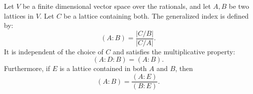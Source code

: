 Let $V$ be a finite dimensional vector space over the rationals, and let $A, B$ be two lattices in $V$. Let $C$ be a lattice containing both. The generalized index is defined by:
$$(A : B) = \frac{|C/B|}{|C/A|}.$$
It is independent of the choice of $C$ and satisfies the multiplicative property:
$$(A : D : B) = (A : B).$$
Furthermore, if $E$ is a lattice contained in both $A$ and $B$, then
$$(A : B) = \frac{(A : E)}{(B : E)}.$$
